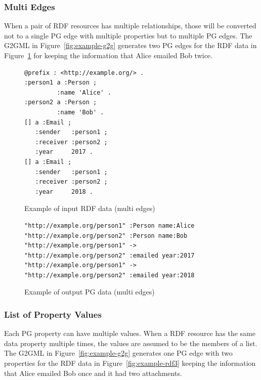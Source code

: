 \documentclass[runningheads]{llncs}
\begin{document}
\subsubsection{Multi Edges}
When a pair of RDF resources has multiple relationships, those will be converted not to a single PG edge with multiple properties but to multiple PG edges. The G2GML in Figure~\ref{fig:example-g2g} generates two PG edges for the RDF data in Figure~\ref{fig:example-rdf2} for keeping the information that Alice emailed Bob twice.

\begin{figure}[!t]
\begin{scriptsize}
\begin{verbatim}
@prefix : <http://example.org/> .
:person1 a :Person ;
         :name 'Alice' .
:person2 a :Person ;
         :name 'Bob' .
[] a :Email ;
   :sender   :person1 ;
   :receiver :person2 ;
   :year     2017 .
[] a :Email ;
   :sender   :person1 ;
   :receiver :person2 ;
   :year     2018 .
\end{verbatim}
\end{scriptsize}
\caption{Example of input RDF data (multi edges)}
\label{fig:example-rdf2}
\end{figure}


\begin{figure}[!t]
\begin{scriptsize}
\begin{verbatim}
"http://example.org/person1" :Person name:Alice
"http://example.org/person2" :Person name:Bob
"http://example.org/person1" -> "http://example.org/person2" :emailed year:2017
"http://example.org/person1" -> "http://example.org/person2" :emailed year:2018
\end{verbatim}
\end{scriptsize}
\caption{Example of output PG data (multi edges)}
\label{fig:example-pg2}
\end{figure}

\subsubsection{List of Property Values}
Each PG property can have multiple values. When a RDF resource has the same data property multiple times, the values are assumed to be the members of a list. The G2GML in Figure~\ref{fig:example-g2g} generates one PG edge with two properties for the RDF data in Figure~\ref{fig:example-rdf3} keeping the information that Alice emailed Bob once and it had two attachments.
\end{document}
